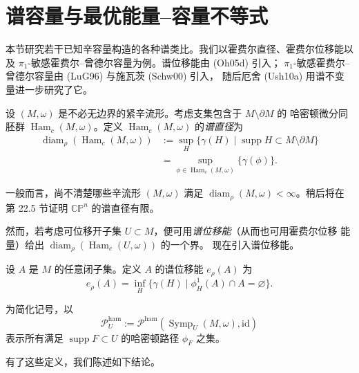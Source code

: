 \section{谱容量与最优能量--容量不等式}
\label{sec:spectral-capacities-energy-capacity}

本节研究若干已知辛容量构造的各种谱类比。我们以霍费尔直径、霍费尔位移能以及
$\pi_1$-敏感霍费尔--曾德尔容量为例。谱位移能由 (Oh05d) 引入；
$\pi_1$-敏感霍费尔--曾德尔容量由\personLu{} (LuG96) 与施瓦茨 (Schw00) 引入，
随后厄舍 (Ush10a) 用谱不变量进一步研究了它。

\begin{definition}[谱直径]
\label{def:22-spectral-diameter}
设 $(M,\omega)$ 是不必无边界的紧辛流形。考虑支集包含于 $M\setminus\partial M$ 的
哈密顿微分同胚群 $\operatorname{Ham}_c(M,\omega)$。定义
$\operatorname{Ham}_c(M,\omega)$ 的\emph{谱直径}为
\[
 \begin{aligned}
 \operatorname{diam}_\rho(\operatorname{Ham}_c(M,\omega))
 &:=\sup_H\{\gamma(H)\mid\operatorname{supp}H\subset M\setminus\partial M\}\\
 &=\sup_{\phi\in\operatorname{Ham}_c(M,\omega)}\{\gamma(\phi)\}.
 \end{aligned}
\]
\end{definition}

一般而言，尚不清楚哪些辛流形 $(M,\omega)$ 满足
$\operatorname{diam}_\rho(M,\omega)<\infty$。稍后将在第 22.5 节证明
$\mathbb{CP}^n$ 的谱直径有限。

然而，若考虑可位移开子集 $U\subset M$，便可用\emph{谱位移能}（从而也可用霍费尔位移
能量）给出 $\operatorname{diam}_\rho(\operatorname{Ham}_c(U,\omega))$ 的一个界。
现在引入谱位移能。

\begin{definition}
\label{def:22-spectral-displacement-energy}
设 $A$ 是 $M$ 的任意闭子集。定义 $A$ 的谱位移能 $e_\rho(A)$ 为
\begin{equation}
 e_\rho(A)=\inf_H\{\gamma(H)\mid\phi_H^1(A)\cap A=\varnothing\}.
 \label{eq:22-spectral-displacement-energy}
\end{equation}
\end{definition}

为简化记号，以
\[
 \mathcal P_U^{\mathrm{ham}}
 :=\mathcal P^{\mathrm{ham}}(\operatorname{Symp}_U(M,\omega),\mathrm{id})
\]
表示所有满足 $\operatorname{supp}F\subset U$ 的哈密顿路径 $\phi_F$ 之集。

有了这些定义，我们陈述如下结论。


